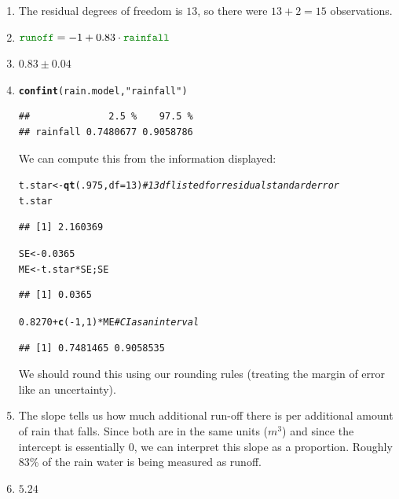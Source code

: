 \documentclass[twoside]{book}\usepackage[]{graphicx}\usepackage[]{xcolor}
\makeatletter
\newcommand{\hlnum}[1]{\textcolor[rgb]{0.686,0.059,0.569}{#1}}%
\newcommand{\hlstr}[1]{\textcolor[rgb]{0.192,0.494,0.8}{#1}}%
\newcommand{\hlcom}[1]{\textcolor[rgb]{0.678,0.584,0.686}{\textit{#1}}}%
\newcommand{\hlopt}[1]{\textcolor[rgb]{0,0,0}{#1}}%
\newcommand{\hlstd}[1]{\textcolor[rgb]{0.345,0.345,0.345}{#1}}%
\newcommand{\hlkwb}[1]{\textcolor[rgb]{0.69,0.353,0.396}{#1}}%
\newcommand{\hlkwc}[1]{\textcolor[rgb]{0.333,0.667,0.333}{#1}}%
\newcommand{\hlkwd}[1]{\textcolor[rgb]{0.737,0.353,0.396}{\textbf{#1}}}%
\newenvironment{kframe}{%
 \def\at@end@of@kframe{}%
 \ifinner\ifhmode%
  \def\at@end@of@kframe{\end{minipage}}%
  \begin{minipage}{\columnwidth}%
 \fi\fi%
 \def\FrameCommand##1{\hskip\@totalleftmargin \hskip-\fboxsep
 \colorbox{shadecolor}{##1}\hskip-\fboxsep
     \hskip-\linewidth \hskip-\@totalleftmargin \hskip\columnwidth}%
 \MakeFramed {\advance\hsize-\width
   \@totalleftmargin\z@ \linewidth\hsize
   \@setminipage}}%
 {\par\unskip\endMakeFramed%
 \at@end@of@kframe}
\newenvironment{knitrout}{}{} %
\newcommand{\variable}[1]{{\color{green!50!black}\texttt{#1}}}
\makeatother
\begin{document}
\begin{solution}
	\begin{enumerate}
		\item
			The residual degrees of freedom is $13$, so there were $13 + 2 = 15$
			observations.
\item
	$\variable{runoff} = -1  + 0.83 \cdot \variable{rainfall}$
\item
	$0.83 \pm 0.04$
\item
\begin{knitrout}
\color{fgcolor}\begin{kframe}
\begin{alltt}
\hlkwd{confint}\hlstd{(rain.model,} \hlstr{"rainfall"}\hlstd{)}
\end{alltt}
\begin{verbatim}
##              2.5 %    97.5 %
## rainfall 0.7480677 0.9058786
\end{verbatim}
\end{kframe}
\end{knitrout}
	We can compute this from the information displayed:
\begin{knitrout}
\color{fgcolor}\begin{kframe}
\begin{alltt}
\hlstd{t.star} \hlkwb{<-} \hlkwd{qt}\hlstd{(} \hlnum{.975}\hlstd{,} \hlkwc{df}\hlstd{=}\hlnum{13} \hlstd{)} \hlcom{# 13 df listed for residual standard error}
\hlstd{t.star}
\end{alltt}
\begin{verbatim}
## [1] 2.160369
\end{verbatim}
\begin{alltt}
\hlstd{SE} \hlkwb{<-} \hlnum{0.0365}
\hlstd{ME} \hlkwb{<-} \hlstd{t.star} \hlopt{*} \hlstd{SE; SE}
\end{alltt}
\begin{verbatim}
## [1] 0.0365
\end{verbatim}
\begin{alltt}
\hlnum{0.8270} \hlopt{+} \hlkwd{c}\hlstd{(}\hlopt{-}\hlnum{1}\hlstd{,}\hlnum{1}\hlstd{)} \hlopt{*} \hlstd{ME}  \hlcom{# CI as an interval}
\end{alltt}
\begin{verbatim}
## [1] 0.7481465 0.9058535
\end{verbatim}
\end{kframe}
\end{knitrout}
We should round this using our rounding rules (treating the margin of error
like an uncertainty).
\item
	The slope tells us how much additional run-off there is per additional
	amount of rain that falls.  Since both are in the same units ($m^3$) and
	since the intercept is essentially 0, we can interpret this slope as a
	proportion.  Roughly 83\% of the rain water is being measured as runoff. 
\item
	$5.24$
	\end{enumerate}
\end{solution}
\end{document}
